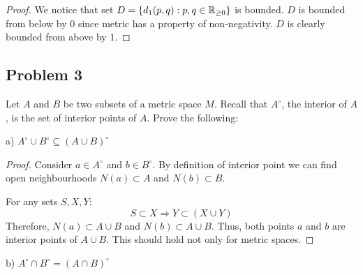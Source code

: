 \documentclass{article}
\newcommand{\R}{\mathbb{R}}
\DeclarePairedDelimiter{\set}{ \{ }{ \} }
\begin{document}
\begin{proof}

We notice that set $D = \set{ d_1(p,q) : p,q \in \R_{\geq 0} }$ is bounded.
$D$ is bounded from below by $0$ since metric has a property of non-negativity.
$D$ is clearly bounded from above by $1$.

\end{proof}


\subsection*{Problem 3}

\begin{tcolorbox}
Let $A$ and $B$ be two subsets of a metric space $M$.
Recall that $A^\circ$, the interior of $A$, is the set of interior points of $A$.
Prove the following:

a) $A^\circ \cup B^\circ \subseteq (A \cup B)^\circ $
\end{tcolorbox}

\begin{proof}

Consider $a \in A^\circ$ and $b \in B^\circ$.
By definition of interior point we can find open neighbourhoods $N(a) \subset A$ and $N(b) \subset B$.

For any sets $S, X, Y$:
\[ S \subset X \Rightarrow Y \subset (X \cup Y) \]
Therefore, $N(a) \subset A \cup B$ and $N(b) \subset A \cup B$.
Thus, both points $a$ and $b$ are interior points of $A \cup B$.
This should hold not only for metric spaces.

\end{proof}

\begin{tcolorbox}
b) $ A^\circ \cap B^\circ = (A \cap B)^\circ $
\end{tcolorbox}
\end{document}
